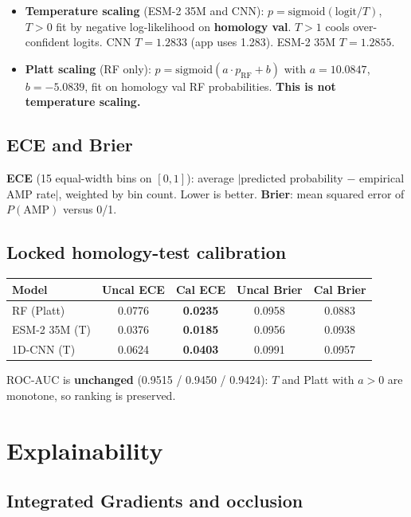 \documentclass[11pt,a4paper]{report}
\begin{document}
\begin{itemize}
\item \textbf{Temperature scaling} (ESM-2 35M and CNN): $p=\mathrm{sigmoid}(\mathrm{logit}/T)$, $T>0$ fit by negative log-likelihood on \textbf{homology val}. $T>1$ cools over-confident logits. CNN $T=1.2833$ (app uses 1.283). ESM-2 35M $T=1.2855$.
\item \textbf{Platt scaling} (RF only): $p=\mathrm{sigmoid}(a\cdot p_{\mathrm{RF}}+b)$ with $a=10.0847$, $b=-5.0839$, fit on homology val RF probabilities. \textbf{This is not temperature scaling.}
\end{itemize}

\section{ECE and Brier}

\textbf{ECE} (15 equal-width bins on $[0,1]$): average $|$predicted probability $-$ empirical AMP rate$|$, weighted by bin count. Lower is better. \textbf{Brier}: mean squared error of $P(\mathrm{AMP})$ versus 0/1.

\section{Locked homology-test calibration}

\begin{tabular}{lcccc}
\toprule
Model & Uncal ECE & Cal ECE & Uncal Brier & Cal Brier \\
\midrule
RF (Platt) & 0.0776 & \textbf{0.0235} & 0.0958 & 0.0883 \\
ESM-2 35M (T) & 0.0376 & \textbf{0.0185} & 0.0956 & 0.0938 \\
1D-CNN (T) & 0.0624 & \textbf{0.0403} & 0.0991 & 0.0957 \\
\bottomrule
\end{tabular}

ROC-AUC is \textbf{unchanged} (0.9515 / 0.9450 / 0.9424): $T$ and Platt with $a>0$ are monotone, so ranking is preserved.

\chapter{Explainability}
\label{ch:xai}

\section{Integrated Gradients and occlusion}
\end{document}
